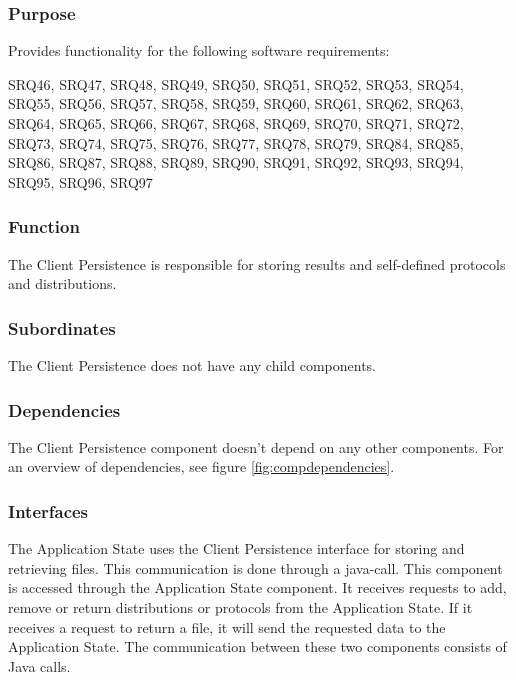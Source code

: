 \subsubsection*{Purpose}
Provides functionality for the following software requirements:

\noindent SRQ46, SRQ47, SRQ48, SRQ49, SRQ50, SRQ51, SRQ52, SRQ53, SRQ54, SRQ55, SRQ56, SRQ57, SRQ58, SRQ59, SRQ60, SRQ61, SRQ62, SRQ63, SRQ64, SRQ65, SRQ66, SRQ67, SRQ68, SRQ69, SRQ70, SRQ71, SRQ72, SRQ73, SRQ74, SRQ75, SRQ76, SRQ77, SRQ78, SRQ79, SRQ84, SRQ85, SRQ86, SRQ87, SRQ88, SRQ89, SRQ90, SRQ91, SRQ92, SRQ93, SRQ94, SRQ95, SRQ96, SRQ97

\subsubsection*{Function}
The Client Persistence is responsible for storing results and self-defined protocols and distributions.

\subsubsection*{Subordinates}
The Client Persistence does not have any child components.

\subsubsection*{Dependencies}
The Client Persistence component doesn't depend on any other components. For an overview of dependencies, see figure \ref{fig:compdependencies}.

\subsubsection*{Interfaces}
The Application State uses the Client Persistence interface for storing and retrieving files. This communication is done through a java-call.
This component is accessed through the Application State component. It receives requests to add, remove or return distributions or protocols from the Application State. If it receives a request to return a file, it will send the requested data to the Application State. The communication between these two components consists of Java calls.

